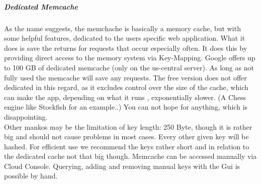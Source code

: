 \documentclass{article}
\begin{document}
\subparagraph{Dedicated Memcache}
 As the name suggests, the memchache is basically a memory cache, but with some helpful features, dedicated to the users specific web application. What it does is save the returns for requests that occur especially often. It does this  by providing direct access to the memory system via Key-Mapping. Google offers up to 100 GB of dedicated memcache (only on the us-central server). As long as not fully used the memcache will save any requests. The free version does not offer dedicated in this regard, as it excludes control over the size of the cache, which can make the app, depending on what it runs , exponentially slower. (A Chess engine like Stockfish for an example..) You can not hope for anything, which is disappointing.  \\
 Other mankos may be the limitation of key length: 250 Byte, though it is rather big and should not cause problems in most cases. Every other given key will be hashed. For efficient use we recommend the keys rather short and in relation to the dedicated cache not that big though. Memcache can be accessed manually via Cloud Console. Querying, adding and removing manual keys with the Gui is possible by hand. 
 
\end{document}
